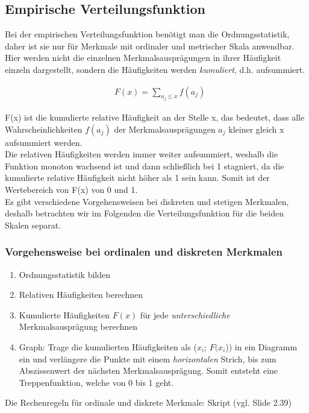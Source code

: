 \documentclass[a4paper]{article}
\begin{document}
\noindent {}


\subsection{Empirische Verteilungsfunktion}\label{sec:emp-vert}
Bei der empirischen Verteilungsfunktion benötigt man die Ordnungsstatistik, daher ist sie nur für Merkmale mit ordinaler und metrischer Skala anwendbar. Hier werden nicht die einzelnen Merkmalsausprägungen in ihrer Häufigkeit einzeln dargestellt, sondern die Häufigkeiten werden \textit{kumuliert}, d.h. aufsummiert.

\begin{align*} 
&F(x) = \sum_{a_j\leq x} f(a_j) 
\end{align*}
    
\noindent F(x) ist die kumulierte relative Häufigkeit an der Stelle x, das bedeutet, dass alle Wahrscheinlichkeiten $f(a_j)$ der Merkmalsausprägungen $a_j$ kleiner gleich x aufsummiert werden.\\
Die relativen Häufigkeiten werden immer weiter aufsummiert, weshalb die Funktion monoton wachsend ist und dann schließlich bei 1 stagniert, da die kumulierte relative Häufigkeit nicht höher als 1 sein kann. Somit ist der Wertebereich von F(x) von 0 und 1.\\

\noindent Es gibt verschiedene Vorgehensweisen bei diskreten und stetigen Merkmalen, deshalb betrachten wir im Folgenden die Verteilungsfunktion für die beiden Skalen separat.

\subsubsection{Vorgehensweise bei ordinalen und diskreten Merkmalen}
\begin{enumerate}
    \item Ordnungsstatistik bilden
    \item Relativen Häufigkeiten berechnen
    \item Kumulierte Häufigkeiten $F(x)$ für jede \textit{unterschiedliche} Merkmalsausprägung berechnen 
    \item Graph: Trage die kumulierten Häufigkeiten als ($x_i$; $F(x_i$)) in ein Diagramm ein und verlängere die Punkte mit einem \textit{horizontalen} Strich, bis zum Abszissenwert der nächsten Merkmalsausprägung. Somit entsteht eine Treppenfunktion, welche von 0 bis 1 geht.
\end{enumerate}
Die Rechenregeln für ordinale und diskrete Merkmale: Skript (vgl. Slide 2.39)
\end{document}
